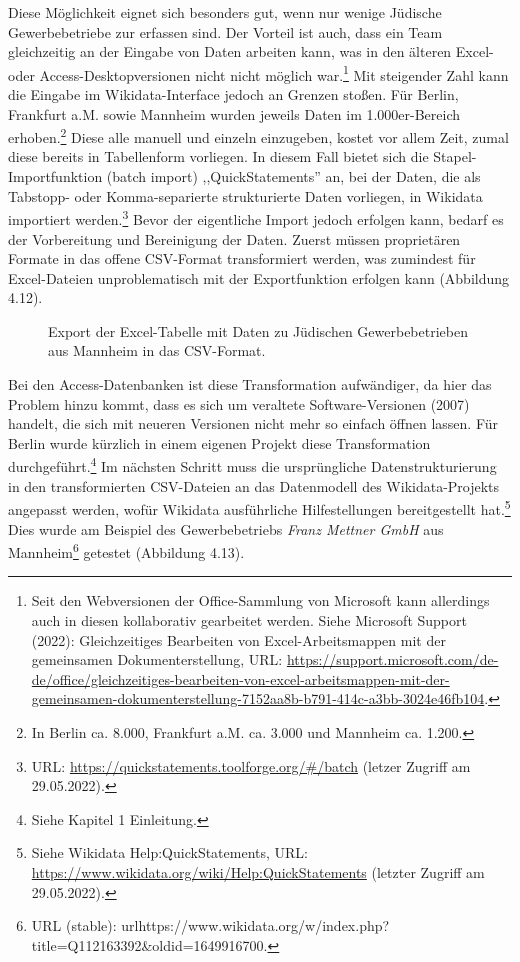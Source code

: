 Diese Möglichkeit eignet sich besonders gut, wenn nur wenige Jüdische Gewerbebetriebe zur erfassen sind. Der Vorteil ist auch, dass ein Team gleichzeitig an der Eingabe von Daten arbeiten kann, was in den älteren Excel- oder Access-Desktopversionen nicht nicht möglich war.\footnote{Seit den Webversionen der Office-Sammlung von Microsoft kann allerdings auch in diesen kollaborativ gearbeitet werden. Siehe Microsoft Support (2022): Gleichzeitiges Bearbeiten von Excel-Arbeitsmappen mit der gemeinsamen Dokumenterstellung, URL: \url{https://support.microsoft.com/de-de/office/gleichzeitiges-bearbeiten-von-excel-arbeitsmappen-mit-der-gemeinsamen-dokumenterstellung-7152aa8b-b791-414c-a3bb-3024e46fb104}.} Mit steigender Zahl kann die Eingabe im Wikidata-Interface jedoch an Grenzen stoßen. Für Berlin, Frankfurt a.M. sowie Mannheim wurden jeweils Daten im 1.000er-Bereich erhoben.\footnote{In Berlin ca. 8.000, Frankfurt a.M. ca. 3.000 und Mannheim ca. 1.200.} Diese alle manuell und einzeln einzugeben, kostet vor allem Zeit, zumal diese bereits in Tabellenform vorliegen. In diesem Fall bietet sich die Stapel-Importfunktion (batch import) ,,QuickStatements'' an, bei der Daten, die als Tabstopp- oder Komma-separierte strukturierte Daten vorliegen, in Wikidata importiert werden.\footnote{URL: \url{https://quickstatements.toolforge.org/\#/batch} (letzer Zugriff am 29.05.2022).} Bevor der eigentliche Import jedoch erfolgen kann, bedarf es der Vorbereitung und Bereinigung der Daten. Zuerst müssen proprietären Formate in das offene CSV-Format transformiert werden, was zumindest für Excel-Dateien unproblematisch mit der Exportfunktion erfolgen kann (Abbildung 4.12).

\begin{figure}[h]
    \centering
    \caption{Export der Excel-Tabelle mit Daten zu Jüdischen Gewerbebetrieben aus Mannheim in das CSV-Format.}
    \label{fig:x cubed graph}
\end{figure}

Bei den Access-Datenbanken ist diese Transformation aufwändiger, da hier das Problem hinzu kommt, dass es sich um veraltete Software-Versionen (2007) handelt, die sich mit neueren Versionen nicht mehr so einfach öffnen lassen. Für Berlin wurde kürzlich in einem eigenen Projekt diese Transformation durchgeführt.\footnote{Siehe Kapitel 1 Einleitung.} Im nächsten Schritt muss die ursprüngliche Datenstrukturierung in den transformierten CSV-Dateien an das Datenmodell des Wikidata-Projekts angepasst werden, wofür Wikidata ausführliche Hilfestellungen bereitgestellt hat.\footnote{Siehe Wikidata Help:QuickStatements, URL: \url{https://www.wikidata.org/wiki/Help:QuickStatements} (letzter Zugriff am 29.05.2022).} Dies wurde am Beispiel des Gewerbebetriebs \textit{Franz Mettner GmbH} aus Mannheim\footnote{URL (stable): url{https://www.wikidata.org/w/index.php?title=Q112163392\&oldid=1649916700}.} getestet (Abbildung 4.13).


